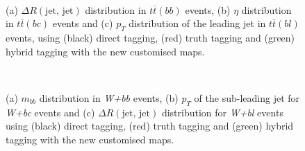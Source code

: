 \begin{figure}[!htbp]
\centering
{}
\\
\caption[A comparison of tagging strategies in $t\bar{t}$ events.]{(a) $ \Delta
  R(\text{jet, jet})$  distribution in $t\overline{t} (bb)$ events, (b)  $\eta$
  distribution in $t\overline{t} (bc)$ events and (c) $p_T$ distribution of the
  leading jet in $t\overline{t} (bl)$ events, using (black) direct tagging,
  (red) truth tagging and (green) hybrid tagging with the new customised maps.}
\label{fig:truth_tag_validation_tt}
\end{figure}

\begin{figure}[!htbp]
\centering
{}
\\
\caption[A comparison of tagging strategie in W + jets events.]{(a) $m_{bb}$
  distribution in  \textit{W+bb} events, (b) $p_T$ of the sub-leading jet for
  \textit{W+bc} events and (c) $\Delta R(\text{jet, jet})$ distribution for
  \textit{W+bl} events using (black) direct tagging, (red) truth tagging and
  (green) hybrid tagging with the new customised maps.}
\label{fig:truth_tag_validation_wjets}
\end{figure}